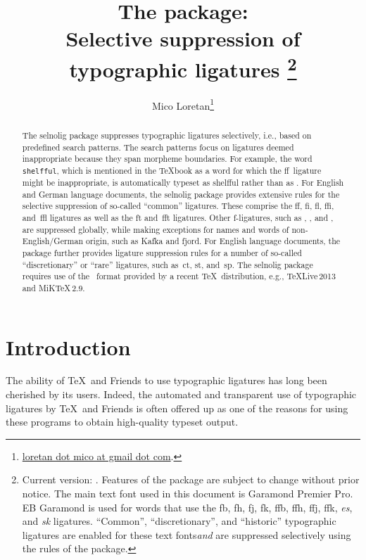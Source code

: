\documentclass[11pt]{article}
\title{The \pkg{\selnoligpackagename} package: \\
Selective suppression of typographic ligatures%
\thanks{Current version: \selnoligpackageversion. Features of the \pkg{selnolig} package are subject to change without prior notice. 
\newline\hspace*{\parindent}
The main text font used in this document is Garamond Premier Pro. {\ebg EB Garamond} is used for words that use the {\ebg fb, fh, fj, fk, ffb, ffh, ffj, ffk, \emph{es}, and \emph{sk}} ligatures. \enquote{Common}, \enquote{discretionary}, and \enquote{historic} typographic ligatures are enabled for these text fonts\textemdash \emph{and} are suppressed selectively using the rules of the \pkg{selnolig} package.} }
\author{Mico Loretan\thanks{
\href{mailto:loretan.mico@gmail.com}{loretan dot mico at gmail dot com}.}}
\date{\selnoligpackagedate}
\newcommand{\pkg}[1]{\textsf{#1}}
\newcommand{\opt}[1]{\texttt{#1}}
\begin{document}
\VerbatimFootnotes
{}

\selnoligoff
\maketitle
\selnoligon

\begin{abstract}

The \pkg{selnolig} package suppresses typographic ligatures selectively, i.e., based on predefined search patterns. The search patterns focus on ligatures deemed inappropriate because they span morpheme boundaries. For example, the word \opt{shelfful}, which is mentioned in the \TeX book as a word for which the ff~ligature might be inappropriate, is automatically typeset as shelfful rather than as .
\newline\hspace*{\parindent}
For English and German language documents, the \pkg{selnolig} package provides extensive rules for the selective suppression of so-called \enquote{common} ligatures. These comprise the ff, fi, fl, ffi, and~ffl ligatures as well as the ft and~fft ligatures. Other f-ligatures, such as {\ebg{}}, {\ebg{}}, {\ebg{}} and {\ebg{}}, are suppressed globally, while making exceptions for names and words of non-English/German origin, such as {\ebg Kafka} and {\ebg fjord}.
\newline\hspace*{\parindent}
For English language documents, the package further provides ligature suppression rules for a number of so-called \enquote{discretionary} or \enquote{rare} ligatures, such as~ct, st, and~sp.
\newline\hspace*{\parindent}
The \pkg{selnolig} package requires use of the \LuaLaTeX\ format provided by a recent \TeX\ distribution, e.g., \TeX Live\,2013 and MiK\TeX\,2.9.
\end{abstract}

\tableofcontents

\clearpage
{}

\section{Introduction}

The ability of \TeX\ and Friends to use typographic ligatures has long been cherished by its users. Indeed, the automated and transparent use of typographic ligatures by \TeX\ and Friends is often offered up as one of the reasons for using these programs to obtain high-quality typeset output.
\end{document}
